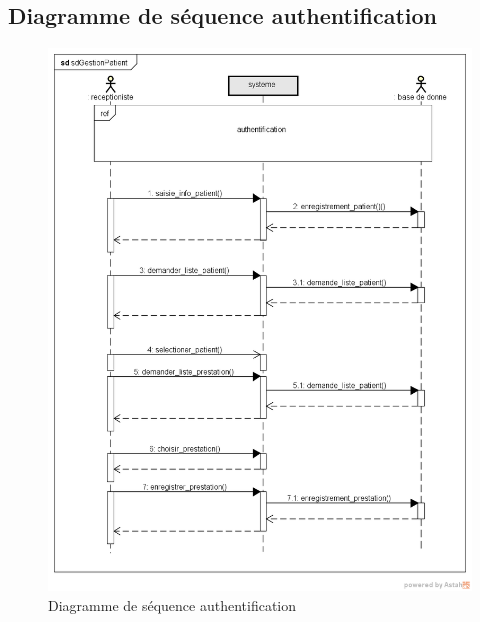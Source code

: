 	   \subsection{Diagramme de séquence authentification}
	  	  \begin{figure}[h]
	  	  \includegraphics[scale=0.5]{Chapitre2/images/auth}
	  \caption{Diagramme de  séquence authentification}
	  	  \end{figure}
	  \newpage
	  
